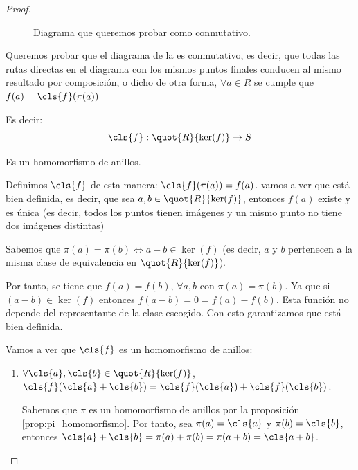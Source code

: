 \begin{proof}

\begin{figure}
\centering
{}
\caption{Diagrama que queremos probar como conmutativo.}
\label{fig:Teorema1Isomorfia:Diag1}
\end{figure}

Queremos probar que el diagrama de la  es conmutativo, es decir, que todas las rutas directas en el diagrama con los mismos puntos finales conducen al mismo resultado por composición, o dicho de otra forma, $\forall a \in R$ se cumple que $f(a)=\cls{f}(\pi(a))$

Es decir:
$$ \cls{f}: \quot{R}{\ker (f)} \rightarrow S$$

Es un homomorfismo de anillos.

Definimos $\cls{f}$ de esta manera: $\cls{f}(\pi(a))=f(a)$. vamos a ver que está bien definida, es decir, que sea $a,b \in \quot{R}{\ker (f)}$, entonces $f(a)$ existe y es única (es decir, todos los puntos tienen imágenes y un mismo punto no tiene dos imágenes distintas)

Sabemos que $\pi(a)=\pi(b) \Leftrightarrow a-b \in \ker (f)$ (es decir, $a$ y $b$ pertenecen a la misma clase de equivalencia en $ \quot{R}{\ker (f)}$).

Por tanto, se tiene que $f(a)=f(b)$, $\forall a,b$ con $\pi(a)=\pi(b)$. Ya que si $(a-b) \in \ker (f)$ entonces $f(a-b)=0=f(a)-f(b)$. Esta función no depende del representante de la clase escogido. Con esto garantizamos que está bien definida.

Vamos a ver que $\cls{f}$ es un homomorfismo de anillos:
\begin{enumerate}
	\item $\forall \cls{a},\cls{b} \in \quot{R}{\ker (f)}$, $\cls{f}(\cls{a}+\cls{b})=\cls{f}(\cls{a})+\cls{f}(\cls{b})$.

	Sabemos que $\pi$ es un homomorfismo de anillos por la proposición \ref{prop:pi_homomorfismo}. Por tanto, sea $\pi(a)=\cls{a}$ y $\pi(b)=\cls{b}$, entonces $\cls{a}+\cls{b}=\pi(a)+\pi(b)=\pi(a+b)=\cls{a+b}$.


\end{enumerate}
\end{proof}
